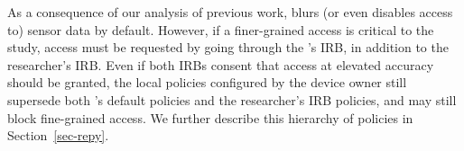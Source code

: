As a consequence of our analysis of previous work, \sysname blurs (or 
even disables access to) sensor data by default.
However, if a finer-grained access is critical to the study, access 
must be requested by going through the \sysname's IRB, in addition to the 
researcher's IRB. Even if both IRBs consent that access at elevated accuracy 
should be granted, the local policies configured by the device owner still 
supersede both \sysname's default policies and the researcher's IRB policies, 
and may still block fine-grained access. We further describe this hierarchy 
of policies in Section~\ref{sec-repy}.

